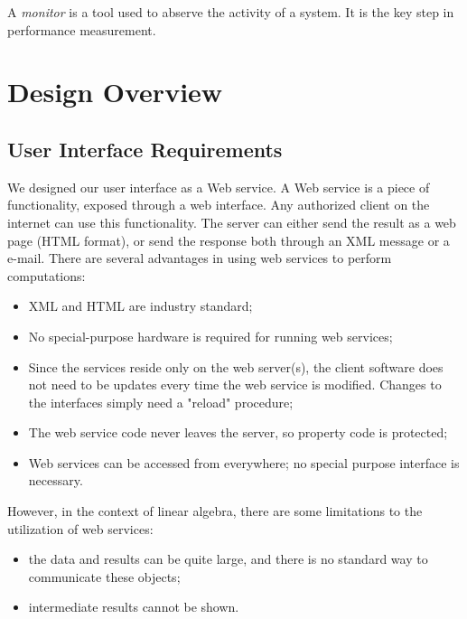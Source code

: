 \documentclass[11pt,relax]{SANDreport}
\begin{document}
A {\sl monitor} is a tool used to abserve the activity of a system. It is the key
step in performance measurement. 

\section{Design Overview}

\subsection{User Interface Requirements}

We designed our user interface as a Web service.
A Web service is a piece of functionality, exposed through a web interface.
Any authorized client on the internet can use this functionality. The server
can either send the result as a web page (HTML format), or send the response
both through an XML message or a e-mail. There are several advantages in using
web services to perform computations:
\begin{itemize}
\item XML and HTML are industry standard;
\item No special-purpose hardware is required for running web services;
\item Since the services reside only on the web server(s), the client software
does not need to be updates every time the web service is modified. Changes to
the interfaces simply need a "reload" procedure;
\item The web service code never leaves the server, so property code is
protected;
\item Web services can be accessed from everywhere; no special
purpose interface is necessary.
\end{itemize}
However, in the context of linear algebra, there are some limitations to the
utilization of web services:
\begin{itemize}
\item the data and results can be quite large, and there is no standard way to
communicate these objects;
\item intermediate results cannot be shown.
\end{itemize}
\end{document}
